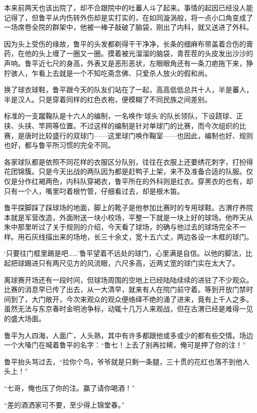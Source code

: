 本来前两天也该出院了，却不合跟院中的吐蕃人斗了起来。事情的起因已经没人能记得了，但鲁平从内伤转外伤却是实打实的，在如同漩涡般，将一点小口角变成了一场席卷全院的群架中，他被一棒子敲破了脑袋，刚出了内科，就又送进了外科。

因为头上受伤的缘故，鲁平的头发都剃得干干净净，长条的细麻布带盖着合伤的膏药，在他的头上缠了一圈又一圈。摸着被光溜溜的脑袋，青茬茬的头皮发出沙沙的声响。鲁平近七尺的身高，外表又是恶形恶状，左眼眼角还有一条刀疤拖下来，狰狞骇人，乍看上去就是一个不知吃斋念佛、只爱杀人放火的假和尚。

换了球衣球鞋，鲁平跟今天的队友们站在了一起，高高低低总共十人，半是蕃人，半是汉人。只是穿着同样的红色衣袍，便模糊了不同民族之间差别。

标准的一支蹴鞠队是十六人的编制，一名唤作‘球头’的队长领队，下设跷球、正挟、头挟、竿网等位置。不过这样的编制是针对单球门的比赛，而今次组织的比赛，是唐时比较盛行的双球门——这里球门唤作鞠室——也因此，编制也好、规则也好，都与鲁平所习惯的完全不同。

各家球队都是依照不同花样的衣服区分队别，往往在衣服上还要绣花刺字，打扮得花团锦簇。只是今天出战的两队因为都是赶鸭子上架，来不及准备合适的队服。仅仅是分作红褐两色，内科队穿褐衣，鲁平所在的外科则是红衣。穿黑衣的也有，却只有一个人，嘴里叼着根竹管，仔细看过去，却是根木笛。

鲁平探脚踩了踩球场的地面，脚上的靴子是他参加比赛时的专用球鞋。古渭疗养院本就是军营改造，外面附送一块小校场，平整一下就是一块上好的球场。他昨天从朱中那里听过了关于规则的介绍，今天看了球场，的确与他过去的球场完全不一样。用石灰线描出来的场地，长三十余丈，宽十五六丈，两边各设一木框的球门。

‘只要往门框里踢是吧……’鲁平望着不远处的球门，心里满是自信。以他的脚法，比起把球踢进只有两尺见方的风流眼，六尺多高，近两丈宽的球门实在太大了。

离球赛开场还有一段时间，但球场周围的空地上已经陆陆续续的进驻了不少观众。比赛的消息早已传了出去，从一大清早，就来有人在院门前守着。等到开放门禁时间到了，大门敞开，今次来观众的观众便络绎不绝的涌了进来，竟有上千人之多。虽然无法与东京春时金明池争标，动辄十几万人来观战，但在古渭已经是难得一见的盛大场面。

鲁平为人四海，人面广，人头熟，其中有许多都跟他或多或少的都有些交情。场边一个大嗓门在喊着鲁平的名字：“鲁七！上去了别再拉稀，俺可是押了你的注！”

鲁平抬头骂过去，“拉你个鸟，爷爷就是只剩一条腿，三十贯的花红也落不到他人头上！”

“七哥，俺也压了你的注。赢了请你喝酒！”

“差的酒洒家可不要，至少得上锦堂春。”

